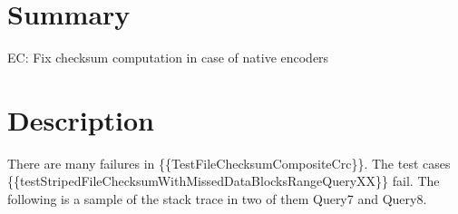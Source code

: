 \documentclass{report}%
\begin{document}
\section{Summary}%
\label{sec:Summary}%
EC: Fix checksum computation in case of native encoders

%
\section{Description}%
\label{sec:Description}%
There are many failures in \{\{TestFileChecksumCompositeCrc\}\}. The test cases \{\{testStripedFileChecksumWithMissedDataBlocksRangeQueryXX\}\} fail. The following is a sample of the stack trace in two of them Query7 and Query8.\newline%
\newline%
\newline%
\end{document}
